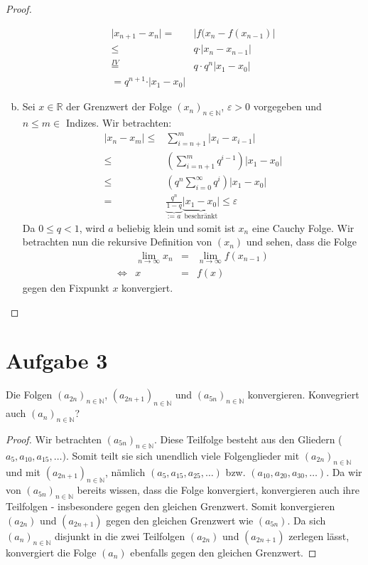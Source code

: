 \documentclass{scrreprt}
\newcommand{\NN}{\mathbb{N}}
\newcommand{\RR}{\mathbb{R}}
\begin{document}
\begin{proof}
\begin{enumerate}[(a)]
            \begin{align*}
            	\vert x_{n+1} - x_n \vert = &\vert f(x_{n} - f(x_{n-1}) \vert\\
            	\leq & q \cdot \vert x_n - x_{n-1} \vert \\
            	\overset{IV}{=} & q \cdot q^n \vert x_1 - x_0\vert \\
            	= q^{n+1} \cdot \vert x_1 - x_0 \vert
            \end{align*}
    	\item
    		Sei $x \in \RR$ der Grenzwert der Folge $(x_n)_{n \in \NN}$, $\varepsilon >0$ vorgegeben und $n \leq m \in$ Indizes. Wir betrachten:
    		\begin{align*}
    			\vert x_n - x_m \vert \leq & \sum\limits_{i = n+1}^m \vert x_i - x_{i-1}\vert\\
    			\leq & \left( \sum\limits_{i = n+1}^m q^{i-1}\right) \vert x_1 - x_0\vert\\
    			\leq & \left( q^n \sum\limits_{i=0}^\infty q^i\right) \vert x_1 - x_0 \vert\\
    			= & \underbrace{\frac{q^n}{1-q}}_{\text{:= $a$}} \underbrace{\vert x_1 - x_0 \vert}_{\text{beschränkt}} \leq \varepsilon
    		\end{align*}
    		Da $0 \leq q < 1$, wird $a$ beliebig klein und somit ist $x_n$ eine Cauchy Folge.
    		Wir betrachten nun die rekursive Definition von $(x_n)$ und sehen, dass die Folge
    		\begin{align*}
    			&\lim\limits_{n \to \infty} x_n & = & \lim\limits_{n \to \infty} f(x_{n-1})\\
    			\Leftrightarrow & x &=& f(x)
    		\end{align*}
    		gegen den Fixpunkt $x$ konvergiert.
    \end{enumerate}
    \end{proof}

    \section*{Aufgabe 3}
    Die Folgen $(a_{2n})_{n \in \NN}$, $(a_{2n + 1})_{n \in \NN}$ und $(a_{5n})_{n \in \NN}$ konvergieren. Konvegriert auch $(a_n)_{n \in \NN}$?
    \begin{proof}
    Wir betrachten $(a_{5n})_{n \in \NN}$. Diese Teilfolge besteht aus den Gliedern ($a_5, a_{10}, a_{15}, \dots)$. Somit teilt sie sich unendlich viele Folgenglieder mit $(a_{2n})_{n \in \NN}$ und mit $(a_{2n +1})_{n \in \NN}$, nämlich $(a_{5}, a_{15}, a_{25}, \dots)$ bzw. $(a_{10}, a_{20}, a_{30}, \dots)$. Da wir von $(a_{5n})_{n \in \NN}$ bereits wissen, dass die Folge konvergiert, konvergieren auch ihre Teilfolgen - insbesondere gegen den gleichen Grenzwert.
    Somit konvergieren $(a_{2n})$ und $(a_{2n + 1})$ gegen den gleichen Grenzwert wie $(a_{5n})$.
    Da sich $(a_n)_{n \in \NN}$ disjunkt in die zwei Teilfolgen $(a_{2n})$ und $(a_{2n + 1})$ zerlegen lässt, konvergiert die Folge $(a_{n})$ ebenfalls gegen den gleichen Grenzwert.
    \end{proof}
\end{document}
